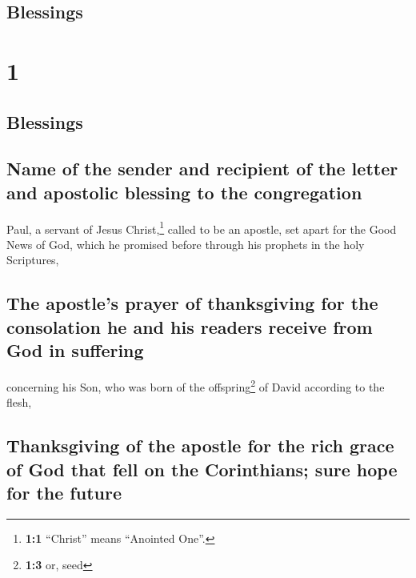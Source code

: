 \hypertarget{blessings}{%
\subsection{Blessings}\label{blessings}}

\hypertarget{section}{%
\section{1}\label{section}}

\hypertarget{blessings-1}{%
\subsection{Blessings}\label{blessings-1}}

\hypertarget{name-of-the-sender-and-recipient-of-the-letter-and-apostolic-blessing-to-the-congregation}{%
\subsection{Name of the sender and recipient of the letter and apostolic
blessing to the
congregation}\label{name-of-the-sender-and-recipient-of-the-letter-and-apostolic-blessing-to-the-congregation}}

 Paul, a servant of Jesus Christ,\footnote{\textbf{1:1}
  ``Christ'' means ``Anointed One''.} called to be an apostle, set apart
for the Good News of God,  which he promised before
through his prophets in the holy Scriptures,

\hypertarget{the-apostles-prayer-of-thanksgiving-for-the-consolation-he-and-his-readers-receive-from-god-in-suffering}{%
\subsection{The apostle's prayer of thanksgiving for the consolation he
and his readers receive from God in
suffering}\label{the-apostles-prayer-of-thanksgiving-for-the-consolation-he-and-his-readers-receive-from-god-in-suffering}}

 concerning his Son, who was born of the
offspring\footnote{\textbf{1:3} or, seed} of David according to the
flesh,

\hypertarget{thanksgiving-of-the-apostle-for-the-rich-grace-of-god-that-fell-on-the-corinthians-sure-hope-for-the-future}{%
\subsection{Thanksgiving of the apostle for the rich grace of God that
fell on the Corinthians; sure hope for the
future}\label{thanksgiving-of-the-apostle-for-the-rich-grace-of-god-that-fell-on-the-corinthians-sure-hope-for-the-future}}

